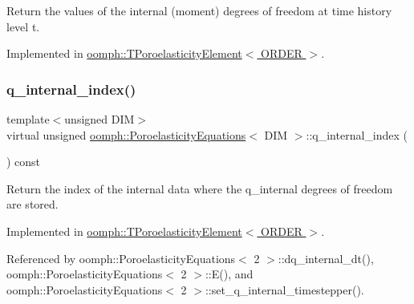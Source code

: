 Return the values of the internal (moment) degrees of freedom at time history level t. 



Implemented in \hyperlink{classoomph_1_1TPoroelasticityElement_a6ac708ffa8850ca009ccedbb651a3152}{oomph\+::\+T\+Poroelasticity\+Element$<$ O\+R\+D\+E\+R $>$}.

\mbox{\label{classoomph_1_1PoroelasticityEquations_a51f9afadce69aeb1ca777d5266f5c4d2}} 
\subsubsection{\texorpdfstring{q\+\_\+internal\+\_\+index()}{q\_internal\_index()}}
{\footnotesize\ttfamily template$<$unsigned D\+IM$>$ \\
virtual unsigned \hyperlink{classoomph_1_1PoroelasticityEquations}{oomph\+::\+Poroelasticity\+Equations}$<$ D\+IM $>$\+::q\+\_\+internal\+\_\+index (\begin{DoxyParamCaption}{ }\end{DoxyParamCaption}) const\hspace{0.3cm}{\ttfamily [pure virtual]}}



Return the index of the internal data where the q\+\_\+internal degrees of freedom are stored. 



Implemented in \hyperlink{classoomph_1_1TPoroelasticityElement_a48a1a06d3f87bbd923e8222cf8c19e66}{oomph\+::\+T\+Poroelasticity\+Element$<$ O\+R\+D\+E\+R $>$}.



Referenced by oomph\+::\+Poroelasticity\+Equations$<$ 2 $>$\+::dq\+\_\+internal\+\_\+dt(), oomph\+::\+Poroelasticity\+Equations$<$ 2 $>$\+::\+E(), and oomph\+::\+Poroelasticity\+Equations$<$ 2 $>$\+::set\+\_\+q\+\_\+internal\+\_\+timestepper().

\mbox{\label{classoomph_1_1PoroelasticityEquations_a432e37d70b8fd6c643946609d5e92ddd}} 
